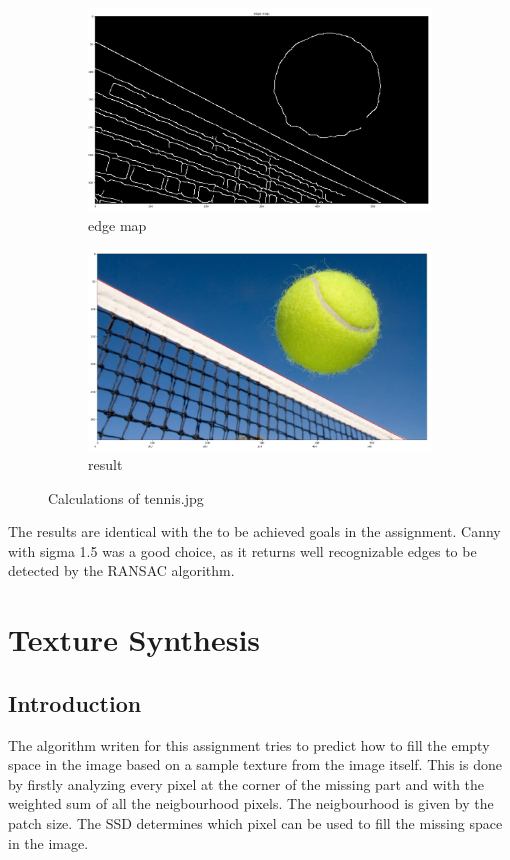 \documentclass[12pt]{article}
\begin{document}
\begin{figure}[!htb]
  \centering
  \begin{subfigure}{.5\textwidth}
    \centering
    \includegraphics[width=0.95\linewidth]{pics/tennisEdgeMap}
    \caption{edge map}
  \end{subfigure}%
  \begin{subfigure}{.5\textwidth}
    \centering
    \includegraphics[width=0.95\linewidth]{pics/tennis}
    \caption{result}
   \end{subfigure}
  \caption{Calculations of tennis.jpg}
\end{figure}

The results are identical with the to be achieved goals in the assignment. Canny with sigma 1.5 was a good choice, as it returns 
well recognizable edges to be detected by the RANSAC algorithm.

\pagebreak

\section{Texture Synthesis}
\subsection{Introduction}
The algorithm writen for this assignment tries to predict how to fill the empty space in the image
based on a sample texture from the image itself. This is done by firstly analyzing every pixel at
the corner of the missing part and with the weighted sum of all the neigbourhood pixels. The neigbourhood
is given by the patch size. The SSD determines which pixel can be used to fill the missing space in the image.
\end{document}
